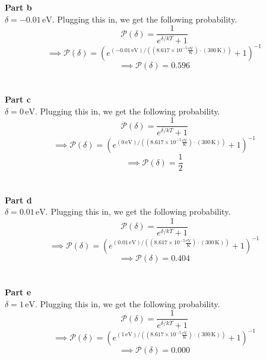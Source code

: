 \documentclass[12pt]{article}
\newcommand{\boltzmannConstInEV}{8.617\times10^{-5}\frac{\text{eV}}{\text{K}}}
\begin{document}
\begin{flushleft}
\textbf{Part b}\\
$\delta=-0.01\,\text{eV}$. Plugging this in, we get the following probability.
$$\mathcal{P}(\delta)=\frac{1}{e^{\delta/kT}+1}$$
$$\implies\mathcal{P}(\delta)=\left(e^{(-0.01\,\text{eV})/((\boltzmannConstInEV)\cdot(300\,\text{K}))}+1\right)^{-1}$$
$$\implies\mathcal{P}(\delta)=0.596$$\\~\\

\textbf{Part c}\\
$\delta=0\,\text{eV}$. Plugging this in, we get the following probability.
$$\mathcal{P}(\delta)=\frac{1}{e^{\delta/kT}+1}$$
$$\implies\mathcal{P}(\delta)=\left(e^{(0\,\text{eV})/((\boltzmannConstInEV)\cdot(300\,\text{K}))}+1\right)^{-1}$$
$$\implies\mathcal{P}(\delta)=\frac{1}{2}$$\\~\\

\textbf{Part d}\\
$\delta=0.01\,\text{eV}$. Plugging this in, we get the following probability.
$$\mathcal{P}(\delta)=\frac{1}{e^{\delta/kT}+1}$$
$$\implies\mathcal{P}(\delta)=\left(e^{(0.01\,\text{eV})/((\boltzmannConstInEV)\cdot(300\,\text{K}))}+1\right)^{-1}$$
$$\implies\mathcal{P}(\delta)=0.404$$\\~\\

\textbf{Part e}\\
$\delta=1\,\text{eV}$. Plugging this in, we get the following probability.
$$\mathcal{P}(\delta)=\frac{1}{e^{\delta/kT}+1}$$
$$\implies\mathcal{P}(\delta)=\left(e^{(1\,\text{eV})/((\boltzmannConstInEV)\cdot(300\,\text{K}))}+1\right)^{-1}$$
$$\implies\mathcal{P}(\delta)=0.000$$\\~\\




\end{flushleft}
\end{document}
